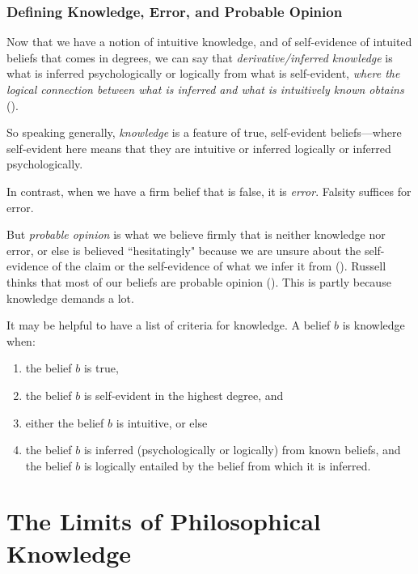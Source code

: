 \documentclass[oneside,letterpaper,12pt]{book}
\begin{document}
\subsection*{Defining Knowledge, Error, and Probable Opinion}
Now that we have a notion of intuitive knowledge, and of self-evidence of intuited beliefs that comes in degrees, we can say that \textit{derivative/inferred knowledge} is what is inferred psychologically or logically from what is self-evident, \textit{where the logical connection between what is inferred and what is intuitively known obtains} (\pageref{connected}). 

So speaking generally, \textit{knowledge} is a feature of true, self-evident beliefs---where self-evident here means that they are intuitive or inferred logically or inferred psychologically.

In contrast, when we have a firm belief that is false, it is \textit{error}. Falsity suffices for error.

But \textit{probable opinion} is what we believe firmly that is neither knowledge nor error, or else is believed ``hesitatingly" because we are unsure about the self-evidence of the claim or the self-evidence of what we infer it from (\pageref{hesitatingly}). Russell thinks that most of our beliefs are probable opinion (\pageref{probable}). This is partly because knowledge demands a lot.

It may be helpful to have a list of criteria for knowledge. A belief $b$ is knowledge when:
\begin{enumerate}
	\item the belief $b$ is true, 
	\item the belief $b$ is self-evident in the highest degree, and 
	\item either the belief $b$ is intuitive, or else 
	\item the belief $b$ is inferred (psychologically or logically) from known beliefs, and the belief $b$ is logically entailed by the belief from which it is inferred. 
\end{enumerate}

\hypertarget{chapter-xiv.-the-limits-of-philosophical-knowledge}{%
\chapter{The Limits of Philosophical Knowledge}\label{chapter-xiv.-the-limits-of-philosophical-knowledge}}
\end{document}
